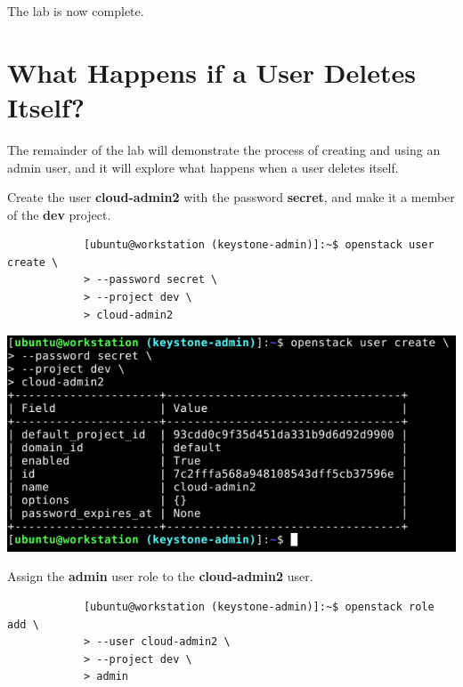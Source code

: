 \documentclass[letterpaper, 12pt]{article}
\begin{document}
\begin{enumerate}
    \begin{labstep}
        The lab is now complete.
    \end{labstep}
\end{enumerate}

\appendix
\section{What Happens if a User Deletes Itself?}
The remainder of the lab will demonstrate the process of creating and using an admin user, and it will explore what happens when a user deletes itself.

\begin{enumerate}
    \begin{labstep}
        Create the user \textbf{cloud-admin2} with the password \textbf{secret}, and make it a member of the
        \textbf{dev} project.
        \begin{lstlisting}
            [ubuntu@workstation (keystone-admin)]:~$ openstack user create \
            > --password secret \
            > --project dev \
            > cloud-admin2
        \end{lstlisting}

        \begin{center}
            \includegraphics[width=\linewidth]{images/appendix/step1.png}
        \end{center}
    \end{labstep}

    \begin{labstep}
        Assign the \textbf{admin} user role to the \textbf{cloud-admin2} user.
        \begin{lstlisting}
            [ubuntu@workstation (keystone-admin)]:~$ openstack role add \
            > --user cloud-admin2 \
            > --project dev \
            > admin
        \end{lstlisting}


\end{labstep}
\end{enumerate}
\end{document}
